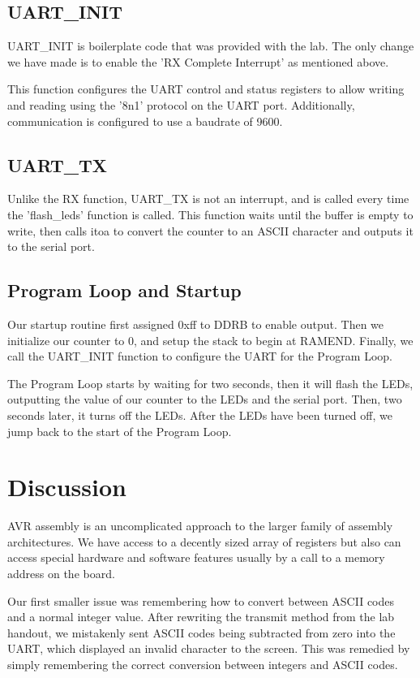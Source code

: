\documentclass[letterpaper,11pt]{texMemo} %
\begin{document}
\subsection*{UART\_INIT}
UART\_INIT is boilerplate code that was provided with the lab. The only change we have made is to enable the 'RX Complete Interrupt' as mentioned above.

This function configures the UART control and status registers to allow writing and reading using the '8n1' protocol on the UART port. Additionally, communication is configured to use a baudrate of 9600.

\subsection*{UART\_TX}
Unlike the RX function, UART\_TX is not an interrupt, and is called every time the 'flash\_leds' function is called. This function waits until the buffer is empty to write, then calls itoa to convert the counter to an ASCII character and outputs it to the serial port.

\subsection*{Program Loop and Startup}
Our startup routine first assigned 0xff to DDRB to enable output. Then we initialize our counter to 0, and setup the stack to begin at RAMEND. Finally, we call the UART\_INIT function to configure the UART for the Program Loop.

The Program Loop starts by waiting for two seconds, then it will flash the LEDs, outputting the value of our counter to the LEDs and the serial port. Then, two seconds later, it turns off the LEDs. After the LEDs have been turned off, we jump back to the start of the Program Loop.

\section*{Discussion}
AVR assembly is an uncomplicated approach to the larger family of assembly architectures. We have access to a decently sized array of registers but also can access special hardware and software features usually by a call to a memory address on the board.

Our first smaller issue was remembering how to convert between ASCII codes and a normal integer value. After rewriting the transmit method from the lab handout, we mistakenly sent ASCII codes being subtracted from zero into the UART, which displayed an invalid character to the screen. This was remedied by simply remembering the correct conversion between integers and ASCII codes.
\end{document}
